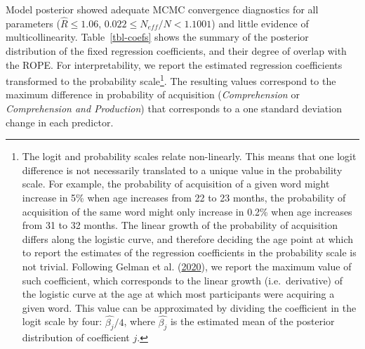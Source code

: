 \documentclass[
]{article}
\begin{document}
Model posterior showed adequate MCMC convergence diagnostics for all
parameters (\(\hat{R} \le 1.06\), \(0.022 \le N_{eff}/N < 1.1001\)) and
little evidence of multicollinearity. Table~\ref{tbl-coefs} shows the
summary of the posterior distribution of the fixed regression
coefficients, and their degree of overlap with the ROPE. For
interpretability, we report the estimated regression coefficients
transformed to the probability scale\footnote{The logit and probability
  scales relate non-linearly. This means that one logit difference is
  not necessarily translated to a unique value in the probability scale.
  For example, the probability of acquisition of a given word might
  increase in 5\% when age increases from 22 to 23 months, the
  probability of acquisition of the same word might only increase in
  0.2\% when age increases from 31 to 32 months. The linear growth of
  the probability of acquisition differs along the logistic curve, and
  therefore deciding the age point at which to report the estimates of
  the regression coefficients in the probability scale is not trivial.
  Following Gelman et al.
  (\protect\hyperlink{ref-gelman2020regression}{2020}), we report the
  maximum value of such coefficient, which corresponds to the linear
  growth (i.e.~derivative) of the logistic curve at the age at which
  most participants were acquiring a given word. This value can be
  approximated by dividing the coefficient in the logit scale by four:
  \(\hat{\beta_j}/4\), where \(\hat{\beta_j}\) is the estimated mean of
  the posterior distribution of coefficient \(j\).}. The resulting
values correspond to the maximum difference in probability of
acquisition (\emph{Comprehension} or \emph{Comprehension and
Production}) that corresponds to a one standard deviation change in each
predictor.
\end{document}
